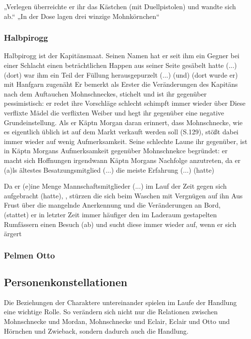 „Verlegen überreichte er ihr das Kästchen (mit Duellpistolen) und wandte sich ab.“
„In der Dose lagen drei winzige Mohnkörnchen“

\subsubsection{Halbpirogg}
Halbpirogg ist der Kapitänsmaat. Seinen Namen hat er seit ihm ein Gegner bei einer Schlacht 
einen beträchtlichen Happen aus seiner Seite gesäbelt hatte (...)(dort) 
war ihm ein Teil der Füllung herausgepurzelt (...) 
(und) (dort wurde er) mit Hanfgarn zugenäht\cite[S. 33]{pir}
Er bemerkt als Erster die Veränderungen des Kapitäns nach 
dem Auftauchen Mohnschneckes, stichelt und ist ihr gegenüber pessimistisch:
er redet ihre Vorschläge schlecht \cite[S. 266]{pir} schimpft immer wieder über Diese verflixte Mädel\cite[S. 145]{pir}
die verflixten Weiber \cite[302]{pir}und 
hegt ihr gegenüber eine negative Grundeinstellung. \cite[S. 297]{pir}
Als er Käptn Morgan daran erinnert, dass Mohnschnecke, wie es eigentlich üblich ist \cite[S.50]{pir} 
auf dem Markt verkauft werden soll (S.129), stößt dabei immer wieder auf wenig Aufmerksamkeit. \cite[S. 145]{pir}
Seine schlechte Laune ihr gegenüber, ist in Käptn Morgans Aufmerksamkeit gegenüber Mohnschnekce begründet: er macht
sich Hoffnungen irgendwann Käptn Morgans Nachfolge anzutreten, 
da er (a)ls ältestes Besatzungsmitglied (...) die meiste Erfahrung (...) (hatte)\cite[S.371]{pir}
 
Da er (e)ine Menge Mannschaftsmitglieder  (...) im Lauf der Zeit gegen sich aufgebracht (hatte), \cite[S.151]{pir}, 
stürzen die sich beim Waschen mit Vergnügen auf ihn \cite[S.151]{pir}
Aus Frust über die mangelnde Anerkennung und die Veränderungen an Bord, 
(stattet) er in letzter Zeit immer häufiger den im Laderaum gestapelten Rumfässern 
einen Besuch (ab) \cite[S. 181]{pir} und sucht diese immer wieder auf, wenn er sich ärgert \cite[S. 303]{pir}


\subsubsection{Pelmen Otto}


\subsection {Personenkonstellationen}
Die Beziehungen der Charaktere untereinander spielen im Laufe der Handlung eine wichtige Rolle. So verändern sich nicht nur die Relationen zwischen Mohnschnecke und Mordan, Mohnschnecke und Eclair, Eclair und Otto und Hörnchen und Zwieback, sondern dadurch auch die Handlung.
